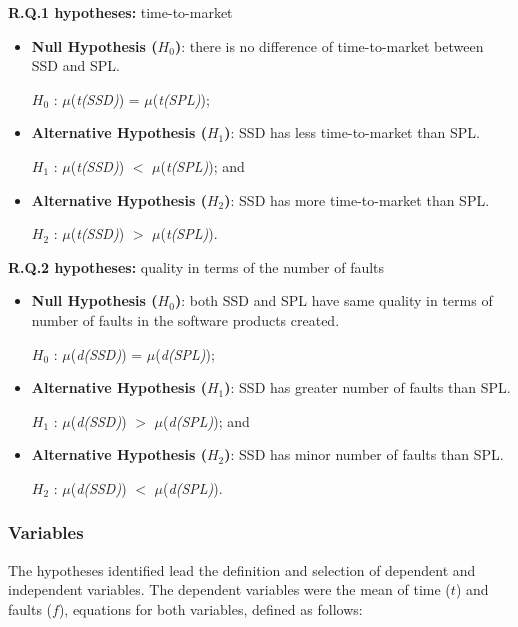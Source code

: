 \textbf{R.Q.1 hypotheses:} time-to-market

	\begin{itemize}
	
	\item \textbf{Null Hypothesis ($H_{0}$)}: there is no difference of time-to-market between SSD and SPL.
	
	$H_{0}$ : $\mu$(\textit{t(SSD)}) =  $\mu$(\textit{t(SPL)});
	
	
	\item \textbf{Alternative Hypothesis ($H_{1}$)}: SSD has less time-to-market than SPL.
	
	$H_{1}$ : $\mu$(\textit{t(SSD)}) $<$ $\mu$(\textit{t(SPL)}); and
		
	
	\item \textbf{Alternative Hypothesis ($H_{2}$)}: SSD has more time-to-market than SPL.
	
	$H_{2}$ :  $\mu$(\textit{t(SSD)}) $>$ $\mu$(\textit{t(SPL)}).		
	
	\end{itemize}	



\textbf{R.Q.2 hypotheses:}
quality in terms of the number of faults
	\begin{itemize}
	
	\item \textbf{Null Hypothesis ($H_{0}$)}: both SSD and SPL have same quality in terms of number of faults in the software products created.
	
	$H_{0}$ : $\mu$(\textit{d(SSD)}) =  $\mu$(\textit{d(SPL)});
	
	
	\item \textbf{Alternative Hypothesis ($H_{1}$)}: SSD has greater number of faults than SPL.
	
	$H_{1}$ : $\mu$(\textit{d(SSD)}) $>$ $\mu$(\textit{d(SPL)}); and
		
	
	\item \textbf{Alternative Hypothesis ($H_{2}$)}: SSD has minor number of faults than SPL.
	
	$H_{2}$ :  $\mu$(\textit{d(SSD)}) $<$ $\mu$(\textit{d(SPL)}).		
	
	\end{itemize}


\subsubsection{Variables}

The hypotheses identified lead the definition and selection of dependent and independent variables. The dependent variables were the mean of time ($t$) and faults ($f$), equations for both variables, defined as follows:

